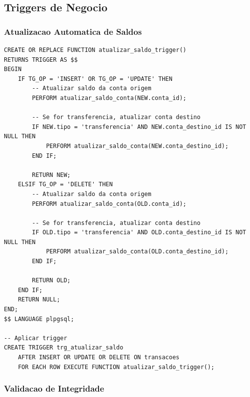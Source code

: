 \subsection{Triggers de Negocio}

\subsubsection{Atualizacao Automatica de Saldos}

\begin{lstlisting}[caption=Trigger para atualizar saldo automaticamente]
CREATE OR REPLACE FUNCTION atualizar_saldo_trigger()
RETURNS TRIGGER AS $$
BEGIN
    IF TG_OP = 'INSERT' OR TG_OP = 'UPDATE' THEN
        -- Atualizar saldo da conta origem
        PERFORM atualizar_saldo_conta(NEW.conta_id);
        
        -- Se for transferencia, atualizar conta destino
        IF NEW.tipo = 'transferencia' AND NEW.conta_destino_id IS NOT NULL THEN
            PERFORM atualizar_saldo_conta(NEW.conta_destino_id);
        END IF;
        
        RETURN NEW;
    ELSIF TG_OP = 'DELETE' THEN
        -- Atualizar saldo da conta origem
        PERFORM atualizar_saldo_conta(OLD.conta_id);
        
        -- Se for transferencia, atualizar conta destino
        IF OLD.tipo = 'transferencia' AND OLD.conta_destino_id IS NOT NULL THEN
            PERFORM atualizar_saldo_conta(OLD.conta_destino_id);
        END IF;
        
        RETURN OLD;
    END IF;
    RETURN NULL;
END;
$$ LANGUAGE plpgsql;

-- Aplicar trigger
CREATE TRIGGER trg_atualizar_saldo
    AFTER INSERT OR UPDATE OR DELETE ON transacoes
    FOR EACH ROW EXECUTE FUNCTION atualizar_saldo_trigger();
\end{lstlisting}

\subsubsection{Validacao de Integridade}

